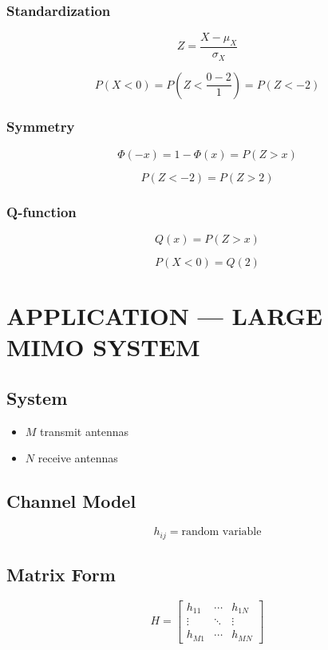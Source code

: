 \documentclass[12pt]{article}
\begin{document}
\subsubsection*{Standardization}

\[
Z = \frac{X - \mu_X}{\sigma_X}
\]

\[
P(X < 0) = P\left(Z < \frac{0 - 2}{1}\right) = P(Z < -2)
\]

\subsubsection*{Symmetry}

\[
\Phi(-x) = 1 - \Phi(x) = P(Z > x)
\]

\[
P(Z < -2) = P(Z > 2)
\]

\subsubsection*{Q-function}

\[
Q(x) = P(Z > x)
\]

\[
P(X < 0) = Q(2)
\]

\section{APPLICATION — LARGE MIMO SYSTEM}

\subsection*{System}

\begin{itemize}
    \item $M$ transmit antennas
    \item $N$ receive antennas
\end{itemize}

\subsection*{Channel Model}

\[
h_{ij} = \text{random variable}
\]

\subsection*{Matrix Form}

\[
H =
\begin{bmatrix}
h_{11} & \cdots & h_{1N} \\
\vdots & \ddots & \vdots \\
h_{M1} & \cdots & h_{MN}
\end{bmatrix}
\]
\end{document}
